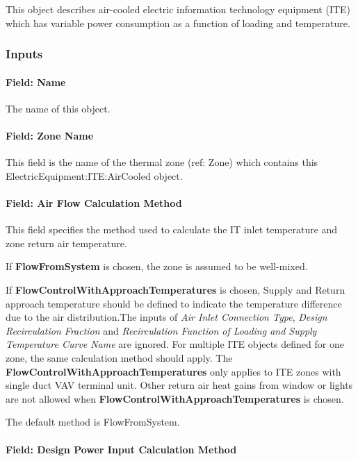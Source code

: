 This object describes air-cooled electric information technology equipment (ITE) which has variable power consumption as a function of loading and temperature.

\subsubsection{Inputs}\label{inputs-9-009}

\paragraph{Field: Name}\label{field-name-9-008}

The name of this object.

\paragraph{Field: Zone Name}\label{field-zone-name-1-005}

This field is the name of the thermal zone (ref: Zone) which contains this ElectricEquipment:ITE:AirCooled object.

\paragraph{Field: Air Flow Calculation Method}\label{field-air-flow-calculation-method}

This field specifies the method used to calculate the IT inlet temperature and zone return air temperature.

If \textbf{FlowFromSystem} is chosen, the zone is assumed to be well-mixed.

If \textbf{FlowControlWithApproachTemperatures} is chosen, Supply and Return approach temperature should be defined to indicate the temperature difference due to the air distribution.The inputs of \textit{Air Inlet Connection Type}, \textit{Design Recirculation Fraction} and \textit{Recirculation Function of Loading and Supply Temperature Curve Name} are ignored. For multiple ITE objects defined for one zone, the same calculation method should apply. The \textbf{FlowControlWithApproachTemperatures} only applies to ITE zones with single duct VAV terminal unit. Other return air heat gains from window or lights are not allowed when \textbf{FlowControlWithApproachTemperatures} is chosen.

The default method is FlowFromSystem.

\paragraph{Field: Design Power Input Calculation Method}\label{field-design-power-input-calculation-method}

